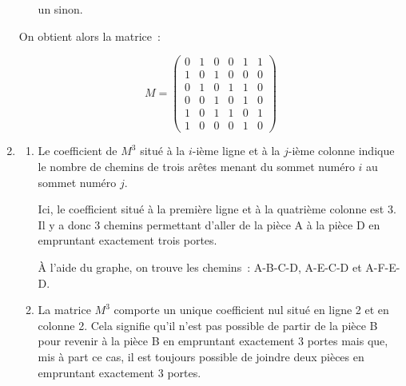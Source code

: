 \begin{corrige}
\begin{enumerate}
\begin{itemize}
               un  \fg{} sinon.
          \end{itemize}
          \par
          On obtient alors la matrice~:
          \par
          \[ M = \begin{pmatrix}
               0 &1 &0 &0 &1 &1 \\
               1 &0 &1 &0 &0 &0 \\
               0 &1 &0 &1 &1 &0 \\
               0 &0 &1 &0 &1 &0 \\
               1 &0 &1 &1 &0 &1\\
          1 &0 &0 &0 &1 &0  \end{pmatrix} \]
          \par
          \item %
          \par
          \begin{enumerate}[label=\alph*.]
               \item %
               \par
               Le coefficient de $M^3$ situé à la $i$-ième ligne et à la $j$-ième colonne indique le nombre de chemins de trois arêtes menant du sommet numéro $i$ au sommet numéro $j$.
               \par
               Ici, le coefficient situé à la première ligne et à la quatrième colonne est 3. Il y a donc 3 chemins permettant d'aller de la pièce A à la pièce D en empruntant exactement trois portes.
               \par
               \`A l'aide du graphe, on trouve les chemins~: A-B-C-D, A-E-C-D et A-F-E-D.
               \par
               \par
               \item %
               \par
               La matrice $M^3$ comporte un unique coefficient nul situé en ligne 2 et en colonne 2. Cela signifie qu'il n'est pas possible de partir de la pièce B pour revenir à la pièce B en empruntant exactement 3 portes mais que, mis à part ce cas, il est toujours possible de joindre deux pièces en empruntant exactement 3 portes.

\end{enumerate}
\end{enumerate}
\end{corrige}
